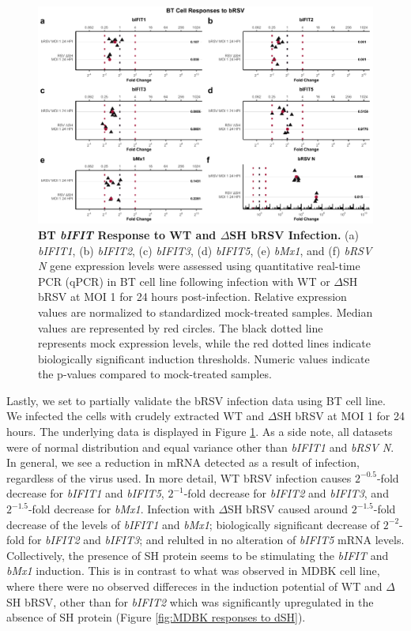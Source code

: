 \begin{figure}
    \centering
    \includegraphics[width=1\linewidth]{07. Chapter 2/Figs/02. Induction/09. bt_brsv.pdf}
    \caption[BT \textit{bIFIT} Response to WT and \(\Delta\)SH bRSV Infection.]{\textbf{BT \textit{bIFIT} Response to WT and \(\Delta\)SH bRSV Infection.} (a) \textit{bIFIT1}, (b) \textit{bIFIT2}, (c) \textit{bIFIT3}, (d) \textit{bIFIT5}, (e) \textit{bMx1}, and (f) \textit{bRSV N} gene expression levels were assessed using quantitative real-time PCR (qPCR) in BT cell line following infection with WT or \(\Delta\)SH bRSV at MOI 1 for 24 hours post-infection. Relative expression values are normalized to standardized mock-treated samples. Median values are represented by red circles. The black dotted line represents mock expression levels, while the red dotted lines indicate biologically significant induction thresholds. Numeric values indicate the p-values compared to mock-treated samples.}
    \label{fig:BT responses to bRSV}
\end{figure}

Lastly, we set to partially validate the bRSV infection data using BT cell line. We infected the cells with crudely extracted WT and \(\Delta\)SH bRSV at MOI 1 for 24 hours. The underlying data is displayed in Figure \ref{fig:BT responses to bRSV}. As a side note, all datasets were of normal distribution and equal variance other than \textit{bIFIT1} and \textit{bRSV N}. In general, we see a reduction in mRNA detected as a result of infection, regardless of the virus used. In more detail, WT bRSV infection causes \(2^{-0.5}\)-fold decrease for \textit{bIFIT1} and \textit{bIFIT5}, \(2^{-1}\)-fold decrease for \textit{bIFIT2} and \textit{bIFIT3}, and \(2^{-1.5}\)-fold decrease for \textit{bMx1}. Infection with \(\Delta\)SH bRSV caused around \(2^{-1.5}\)-fold decrease of the levels of \textit{bIFIT1} and \textit{bMx1}; biologically significant decrease of \(2^{-2}\)-fold for \textit{bIFIT2} and \textit{bIFIT3}; and relulted in no alteration of \textit{bIFIT5} mRNA levels. Collectively, the presence of SH protein seems to be stimulating the \textit{bIFIT} and \textit{bMx1} induction. This is in contrast to what was observed in MDBK cell line, where there were no observed differeces in the induction potential of WT and \(\Delta\)SH bRSV, other than for \textit{bIFIT2} which was significantly upregulated in the absence of SH protein (Figure \ref{fig:MDBK responses to dSH}).

